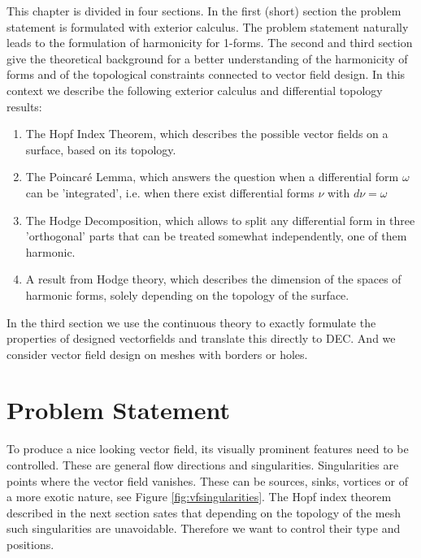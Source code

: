 This chapter is divided in four sections. In the first (short) section the problem statement is formulated with exterior calculus. The problem statement naturally leads to the formulation of harmonicity for 1-forms.  The second  and third section give the theoretical background for a better understanding of the harmonicity of forms and of the topological constraints connected to vector field design. In this context we describe the following exterior calculus and differential topology results:
\begin{enumerate}
\item The Hopf Index Theorem, which describes the possible vector fields on a surface, based on its topology.
\item The Poincar\'e Lemma, which answers the question when a differential form $\omega$ can be 'integrated', i.e. when there exist differential forms $\nu$ with $d\nu = \omega$
\item The Hodge Decomposition, which allows to split any differential form in three 'orthogonal' parts that can be treated somewhat independently, one of them harmonic.
\item A result from Hodge theory, which describes the dimension of the spaces of harmonic forms, solely depending on the topology of the surface.
\end{enumerate}
In the third section we use the continuous theory to  exactly formulate the properties of designed vectorfields and translate this directly to DEC. And we consider vector field design on meshes with borders or holes. 

\section{Problem Statement}
\label{sec:vfproblemstatement}
To produce a nice looking vector field, its visually prominent features need to be controlled. These are general flow directions and singularities.
Singularities are points where the vector field vanishes. These can be sources, sinks, vortices or of a more exotic nature, see Figure \ref{fig:vfsingularities}. The Hopf index theorem described in the next section sates that depending on the topology of the mesh such singularities are unavoidable. Therefore we want to control their type and positions.

